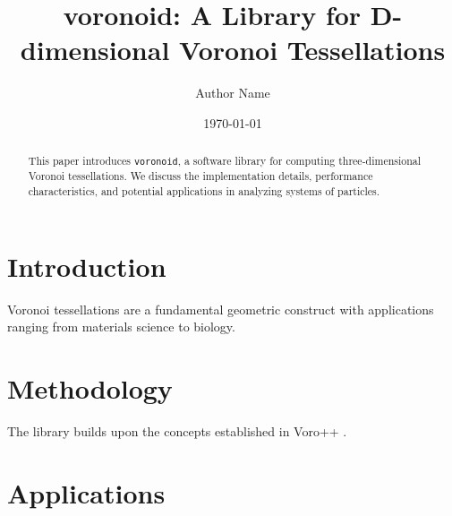 \documentclass[a4paper,11pt]{article}
\title{voronoid: A Library for D-dimensional Voronoi Tessellations}
\author{Author Name}
\date{\today}
\begin{document}
\maketitle

\begin{abstract}
This paper introduces \texttt{voronoid}, a software library for computing three-dimensional Voronoi tessellations. We discuss the implementation details, performance characteristics, and potential applications in analyzing systems of particles.
\end{abstract}

\section{Introduction}
Voronoi tessellations are a fundamental geometric construct with applications ranging from materials science to biology.

\section{Methodology}
The library builds upon the concepts established in Voro++ \cite{rycroft2009voro}.

\section{Applications}



\end{document}
